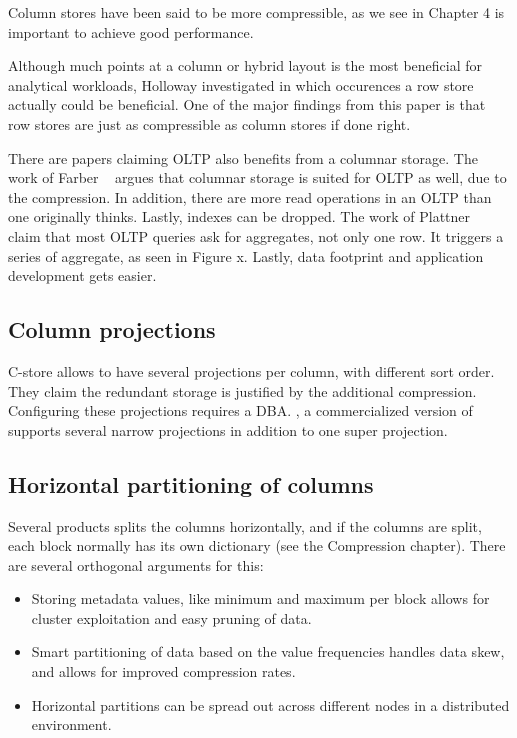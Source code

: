 Column stores have been said to be more compressible, as we see in Chapter 4 is important to achieve good performance.

Although much points at a column or hybrid layout is the most beneficial for analytical workloads, Holloway \ea \cite{Holloway2008-rr} investigated in which occurences a row store actually could be beneficial. One of the major findings from this paper is that row stores are just as compressible as column stores if done right.

There are papers claiming OLTP also benefits from a columnar storage. The work of Farber \ea~\cite{Farber2012-vh} argues that columnar storage is suited for OLTP as well, due to the compression. In addition, there are more read operations in an OLTP than one originally thinks. Lastly, indexes can be dropped. The work of Plattner \ea~\cite{Plattner2014-fr} claim that most OLTP queries ask for aggregates, not only one row. It triggers a series of aggregate, as seen in Figure x. Lastly, data footprint and application development gets easier.

\subsection{Column projections}
\label{sub:Column projections}
C-store allows to have several projections per column, with different sort order. They claim the redundant storage is justified by the additional compression. Configuring these projections requires a DBA. , a commercialized version of  supports several narrow projections in addition to one super projection.

\subsection{Horizontal partitioning of columns}
\label{sub:Horizontal partitioning of columns}
Several products splits the columns horizontally, and if the columns are split, each block normally has its own dictionary (see the Compression chapter). There are several orthogonal arguments for this:
\begin{itemize}
  \item Storing metadata values, like minimum and maximum per block allows for cluster exploitation and easy pruning of data.
  \item Smart partitioning of data based on the value frequencies handles data skew, and allows for improved compression rates.
  \item Horizontal partitions can be spread out across different nodes in a distributed environment.
\end{itemize}

